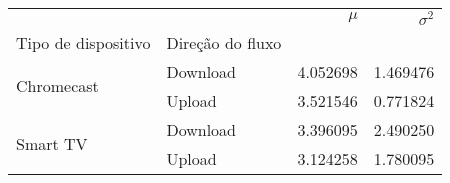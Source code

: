 \begin{tabular}{llrr}
\toprule
 &  & $\mu$ & $\sigma^2$ \\
Tipo de dispositivo & Direção do fluxo &  &  \\
\midrule
\multirow[t]{2}{*}{Chromecast} & Download & 4.052698 & 1.469476 \\
 & Upload & 3.521546 & 0.771824 \\
\cline{1-4}
\multirow[t]{2}{*}{Smart TV} & Download & 3.396095 & 2.490250 \\
 & Upload & 3.124258 & 1.780095 \\
\cline{1-4}
\bottomrule
\end{tabular}
